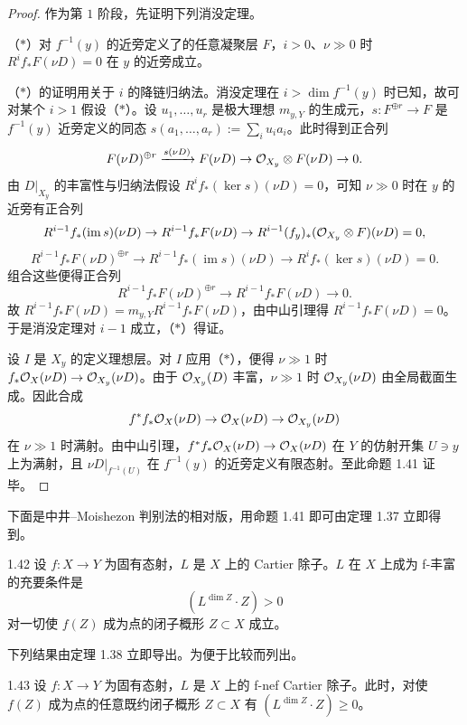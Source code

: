 \begin{proof}
作为第 $1$ 阶段，先证明下列消没定理。

（$*$）对 $f^{-1}(y)$ 的近旁定义了的任意凝聚层 $F$，$i>0$、$\nu\gg0$ 时 $R^if_*F(\nu D)=0$ 在 $y$ 的近旁成立。

（$*$）的证明用关于 $i$ 的降链归纳法。消没定理在 $i>\dim f^{-1}(y)$ 时已知，故可对某个 $i>1$ 假设（$*$）。设 $u_1,\dots,u_r$ 是极大理想 $m_{y,Y}$ 的生成元，$s:F^{\oplus r}\to F$ 是 $f^{-1}(y)$ 近旁定义的同态 $s(a_1,\dots,a_r):=\sum_i u_ia_i$。此时得到正合列
\[ F(\nu D)^{\oplus r}\xrightarrow{s(\nu D)}F(\nu D)\to\mathcal{O}_{X_y}\otimes F(\nu D)\to0. \]
由 $D|_{X_y}$ 的丰富性与归纳法假设 $R^if_*(\ker s)(\nu D)=0$，可知 $\nu\gg0$ 时在 $y$ 的近旁有正合列
\[ R^{i-1}f_*(\operatorname{im}s)(\nu D)\to R^{i-1}f_*F(\nu D)\to R^{i-1}(f_y)_*(\mathcal{O}_{X_y}\otimes F)(\nu D)=0, \]
\[ R^{i-1}f_*F(\nu D)^{\oplus r}\to R^{i-1}f_*(\operatorname{im}s)(\nu D)\to R^if_*(\ker s)(\nu D)=0. \]
组合这些便得正合列
\[ R^{i-1}f_*F(\nu D)^{\oplus r}\to R^{i-1}f_*F(\nu D)\to0. \]
故 $R^{i-1}f_*F(\nu D)=m_{y,Y}R^{i-1}f_*F(\nu D)$，由中山引理得 $R^{i-1}f_*F(\nu D)=0$。于是消没定理对 $i-1$ 成立，（$*$）得证。

设 $I$ 是 $X_y$ 的定义理想层。对 $I$ 应用（$*$），便得 $\nu\gg1$ 时 $f_*\mathcal{O}_X(\nu D)\to\mathcal{O}_{X_y}(\nu D)$。由于 $\mathcal{O}_{X_y}(D)$ 丰富，$\nu\gg1$ 时 $\mathcal{O}_{X_y}(\nu D)$ 由全局截面生成。因此合成
\[ f^*f_*\mathcal{O}_X(\nu D)\to\mathcal{O}_X(\nu D)\to\mathcal{O}_{X_y}(\nu D) \]
在 $\nu\gg1$ 时满射。由中山引理，$f^*f_*\mathcal{O}_X(\nu D)\to\mathcal{O}_X(\nu D)$ 在 $Y$ 的仿射开集 $U\ni y$ 上为满射，且 $\nu D|_{f^{-1}(U)}$ 在 $f^{-1}(y)$ 的近旁定义有限态射。至此命题 1.41 证毕。
\end{proof}


下面是中井--Moishezon 判别法的相对版，用命题 1.41 即可由定理 1.37 立即得到。

\begin{theorem}{1.42}
设 $f:X\to Y$ 为固有态射，$L$ 是 $X$ 上的 Cartier 除子。$L$ 在 $X$ 上成为 f-丰富的充要条件是
\[ (L^{\dim Z}\cdot Z)>0 \]
对一切使 $f(Z)$ 成为点的闭子概形 $Z\subset X$ 成立。
\end{theorem}

下列结果由定理 1.38 立即导出。为便于比较而列出。

\begin{corollary}{1.43}
设 $f:X\to Y$ 为固有态射，$L$ 是 $X$ 上的 f-nef Cartier 除子。此时，对使 $f(Z)$ 成为点的任意既约闭子概形 $Z\subset X$ 有 $(L^{\dim Z}\cdot Z)\ge0$。
\end{corollary}

